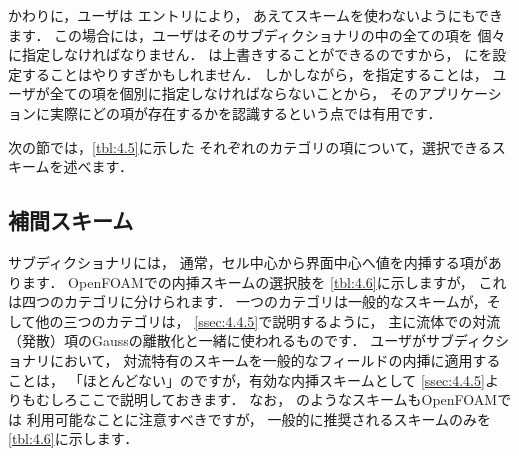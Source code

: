 かわりに，ユーザは
%
%
エントリにより，
あえてスキームを使わないようにもできます．
この場合には，ユーザはそのサブディクショナリの中の全ての項を
個々に指定しなければなりません．
は上書きすることができるのですから，
にを設定することはやりすぎかもしれません．
しかしながら，を指定することは，
ユーザが全ての項を個別に指定しなければならないことから，
そのアプリケーションに実際にどの項が存在するかを認識するという点では有用です．

次の節では，\autoref{tbl:4.5}に示した
それぞれのカテゴリの項について，選択できるスキームを述べます．


\subsection{補間スキーム}
\label{ssec:4.4.1}
サブディクショナリには，
通常，セル中心から界面中心へ値を内挿する項があります．
OpenFOAMでの内挿スキームの選択肢を
\autoref{tbl:4.6}に示しますが，
これは四つのカテゴリに分けられます．
一つのカテゴリは一般的なスキームが，そして他の三つのカテゴリは，
\autoref{ssec:4.4.5}で説明するように，
主に流体での対流（発散）項のGaussの離散化と一緒に使われるものです．
ユーザがサブディクショナリにおいて，
対流特有のスキームを一般的なフィールドの内挿に適用することは，
「ほとんどない」のですが，有効な内挿スキームとして
\autoref{ssec:4.4.5}よりもむしろここで説明しておきます．
なお，
%
%
のようなスキームもOpenFOAMでは
利用可能なことに注意すべきですが，
一般的に推奨されるスキームのみを\autoref{tbl:4.6}に示します．

